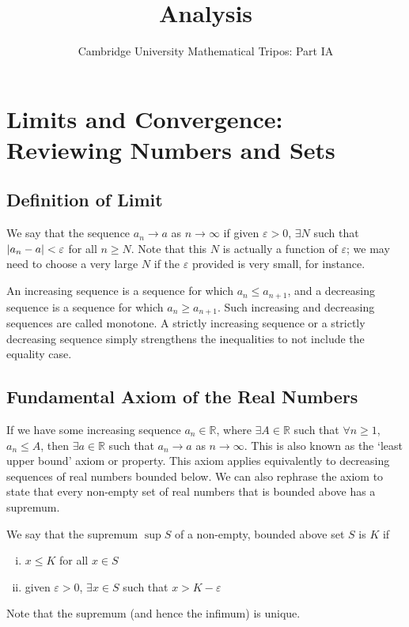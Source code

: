 \documentclass{article}
\title{Analysis}
\author{Cambridge University Mathematical Tripos: Part IA}
\begin{document}
\maketitle

\tableofcontents
\newpage

\section{Limits and Convergence: Reviewing Numbers and Sets}
\subsection{Definition of Limit}
\begin{definition}
    We say that the sequence $a_n \to a$ as $n \to \infty$ if given $\varepsilon > 0$, $\exists N$ such that $\abs{a_n - a} < \varepsilon$ for all $n \geq N$. Note that this $N$ is actually a function of $\varepsilon$; we may need to choose a very large $N$ if the $\varepsilon$ provided is very small, for instance.
\end{definition}
\begin{definition}
    An increasing sequence is a sequence for which $a_n \leq a_{n+1}$, and a decreasing sequence is a sequence for which $a_n \geq a_{n+1}$. Such increasing and decreasing sequences are called monotone.
    A strictly increasing sequence or a strictly decreasing sequence simply strengthens the inequalities to not include the equality case.
\end{definition}

\subsection{Fundamental Axiom of the Real Numbers}
If we have some increasing sequence $a_n \in \mathbb R$, where $\exists A \in \mathbb R$ such that $\forall n \geq 1$, $a_n \leq A$, then $\exists a \in \mathbb R$ such that $a_n \to a$ as $n \to \infty$. This is also known as the `least upper bound' axiom or property. This axiom applies equivalently to decreasing sequences of real numbers bounded below. We can also rephrase the axiom to state that every non-empty set of real numbers that is bounded above has a supremum.
\begin{definition}
    We say that the supremum $\sup S$ of a non-empty, bounded above set $S$ is $K$ if
    \begin{enumerate}[(i)]
        \item $x \leq K$ for all $x \in S$
        \item given $\varepsilon > 0$, $\exists x \in S$ such that $x > K - \varepsilon$
    \end{enumerate}
\end{definition}
Note that the supremum (and hence the infimum) is unique.
\end{document}
